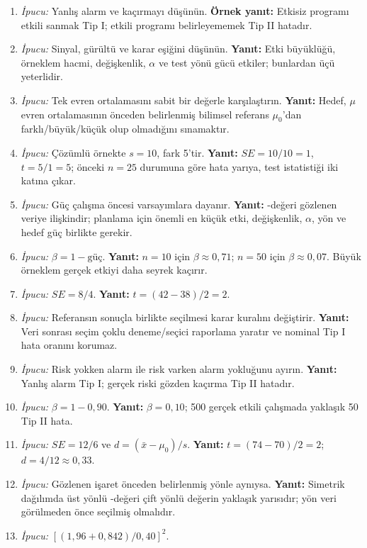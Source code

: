 \begin{enumerate}[leftmargin=*,itemsep=5pt]
\item \emph{İpucu:} Yanlış alarm ve kaçırmayı düşünün.
\textbf{Örnek yanıt:} Etkisiz programı etkili sanmak Tip I; etkili programı
belirleyememek Tip II hatadır.
\item \emph{İpucu:} Sinyal, gürültü ve karar eşiğini düşünün.
\textbf{Yanıt:} Etki büyüklüğü, örneklem hacmi, değişkenlik, $\alpha$ ve test
yönü gücü etkiler; bunlardan üçü yeterlidir.
\item \emph{İpucu:} Tek evren ortalamasını sabit bir değerle karşılaştırın.
\textbf{Yanıt:} Hedef, $\mu$ evren ortalamasının önceden belirlenmiş bilimsel
referans $\mu_0$'dan farklı/büyük/küçük olup olmadığını sınamaktır.
\item \emph{İpucu:} Çözümlü örnekte $s=10$, fark 5'tir.
\textbf{Yanıt:} $SE=10/10=1$, $t=5/1=5$; önceki $n=25$ durumuna göre hata
yarıya, test istatistiği iki katına çıkar.
\item \emph{İpucu:} Güç çalışma öncesi varsayımlara dayanır.
\textbf{Yanıt:} \pval-değeri gözlenen veriye ilişkindir; planlama için önemli
en küçük etki, değişkenlik, $\alpha$, yön ve hedef güç birlikte gerekir.
\item \emph{İpucu:} $\beta=1-\text{güç}$.
\textbf{Yanıt:} $n=10$ için $\beta\approx0{,}71$; $n=50$ için
$\beta\approx0{,}07$. Büyük örneklem gerçek etkiyi daha seyrek kaçırır.
\item \emph{İpucu:} $SE=8/4$.
\textbf{Yanıt:} $t=(42-38)/2=2$.
\item \emph{İpucu:} Referansın sonuçla birlikte seçilmesi karar kuralını değiştirir.
\textbf{Yanıt:} Veri sonrası seçim çoklu deneme/seçici raporlama yaratır ve
nominal Tip I hata oranını korumaz.
\item \emph{İpucu:} Risk yokken alarm ile risk varken alarm yokluğunu ayırın.
\textbf{Yanıt:} Yanlış alarm Tip I; gerçek riski gözden kaçırma Tip II hatadır.
\item \emph{İpucu:} $\beta=1-0{,}90$.
\textbf{Yanıt:} $\beta=0{,}10$; 500 gerçek etkili çalışmada yaklaşık 50 Tip II hata.
\item \emph{İpucu:} $SE=12/6$ ve $d=(\bar x-\mu_0)/s$.
\textbf{Yanıt:} $t=(74-70)/2=2$; $d=4/12\approx0{,}33$.
\item \emph{İpucu:} Gözlenen işaret önceden belirlenmiş yönle aynıysa.
\textbf{Yanıt:} Simetrik dağılımda üst yönlü \pval-değeri çift yönlü değerin
yaklaşık yarısıdır; yön veri görülmeden önce seçilmiş olmalıdır.
\item \emph{İpucu:} $[(1{,}96+0{,}842)/0{,}40]^2$.

\end{enumerate}
